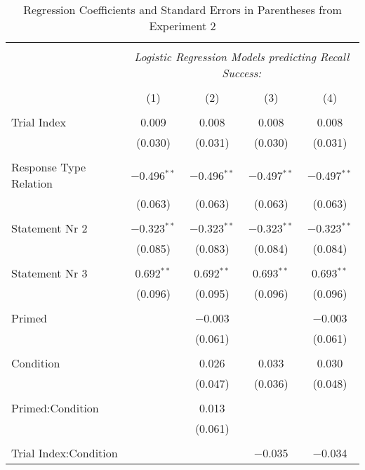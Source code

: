 
\begin{table}[!htbp] \centering
  \caption{Regression Coefficients and Standard Errors in Parentheses from Experiment 2}
  \label{table:main2}
  \small
  \renewcommand{\arraystretch}{0.6}
\begin{tabular}{@{\extracolsep{5pt}}lcccc}
\\[-1.8ex]\hline
\hline \\[-1.8ex]
 & \multicolumn{4}{c}{\textit{Logistic Regression Models predicting Recall Success:}} \\
\cline{2-5}
\\[-1.8ex] & (1) & (2) & (3) & (4)\\
\hline \\[-1.8ex]
 Trial Index & 0.009 & 0.008 & 0.008 & 0.008 \\
  & (0.030) & (0.031) & (0.030) & (0.031) \\
  & & & & \\
 Response Type Relation & $-$0.496$^{**}$ & $-$0.496$^{**}$ & $-$0.497$^{**}$ & $-$0.497$^{**}$ \\
  & (0.063) & (0.063) & (0.063) & (0.063) \\
  & & & & \\
 Statement Nr 2 & $-$0.323$^{**}$ & $-$0.323$^{**}$ & $-$0.323$^{**}$ & $-$0.323$^{**}$ \\
  & (0.085) & (0.083) & (0.084) & (0.084) \\
  & & & & \\
 Statement Nr 3 & 0.692$^{**}$ & 0.692$^{**}$ & 0.693$^{**}$ & 0.693$^{**}$ \\
  & (0.096) & (0.095) & (0.096) & (0.096) \\
  & & & & \\
 Primed &  & $-$0.003 &  & $-$0.003 \\
  &  & (0.061) &  & (0.061) \\
  & & & & \\
 Condition &  & 0.026 & 0.033 & 0.030 \\
  &  & (0.047) & (0.036) & (0.048) \\
  & & & & \\
 Primed:Condition &  & 0.013 &  &  \\
  &  & (0.061) &  &  \\
  & & & & \\
 Trial Index:Condition &  &  & $-$0.035 & $-$0.034 \\

\end{tabular}
\end{table}
